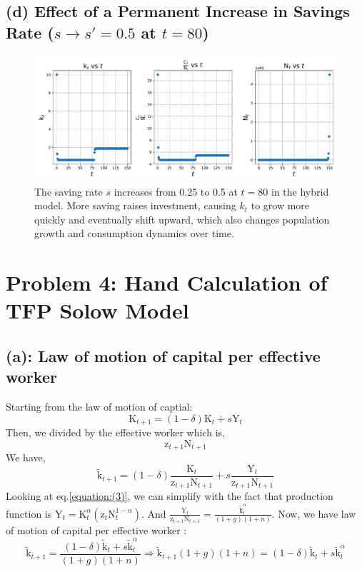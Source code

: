 \documentclass[12pt]{article}
\begin{document}
    \subsection*{(d) Effect of a Permanent Increase in Savings Rate ($s \to s'=0.5$ at $t=80$)}
    \begin{figure}[H]
        \centering
        \includegraphics[width=1\textwidth]{3(d).pdf}
        \caption{The saving rate $s$ increases from 0.25 to 0.5 at $t=80$ in the hybrid model.
        More saving raises investment, causing $k_t$ to grow more quickly and eventually shift 
        upward, which also changes population growth and consumption dynamics over time.}
        \label{fig:3(d)}
    \end{figure}
\section*{Problem 4: Hand Calculation of TFP Solow Model}
\subsection*{(a): Law of motion of capital per effective worker}
Starting from the law of motion of captial:
\begin{equation}
    \mathrm{K}_{t+1} = (1-\delta)\mathrm{K}_t + s\mathrm{Y}_t
\end{equation}
Then, we divided by the effective worker which is,
\begin{equation}
    \mathrm{z}_{t+1}\mathrm{N}_{t+1}
\end{equation}
We have,
\begin{equation}
    \tilde{\mathrm{k}}_{t+1} = (1-\delta)\frac{\mathrm{K}_t}{\mathrm{z}_{t+1}\mathrm{N}_{t+1}} + s\frac{\mathrm{Y}_t}{\mathrm{z}_{t+1}\mathrm{N}_{t+1}}
    \label{equation:(3)}
\end{equation}
Looking at eq.\ref{equation:(3)}, we can simplify with the fact that production function is $\mathrm{Y}_t = \mathrm{K}_t^{\alpha}(\mathrm{z}_t\mathrm{N}_t^{1-\alpha})$. And $\frac{\mathrm{Y}_t}{\mathrm{z}_{t+1}\mathrm{N}_{t+1}} = \frac{\tilde{\mathrm{k}}_t^{\alpha}}{(1+g)(1+n)}$. Now, we have law of motion of capital per effective worker :
\begin{equation}
    \tilde{\mathrm{k}}_{t+1} = \frac{(1-\delta)\tilde{\mathrm{k}}_t + s\tilde{\mathrm{k}}_t^{\alpha}}{(1+g)(1+n)} \Rightarrow  \tilde{\mathrm{k}}_{t+1}(1+g)(1+n) = (1-\delta)\tilde{\mathrm{k}}_t + s\tilde{\mathrm{k}}_t^{\alpha}
    \label{equation:(4)}
\end{equation}
\end{document}
